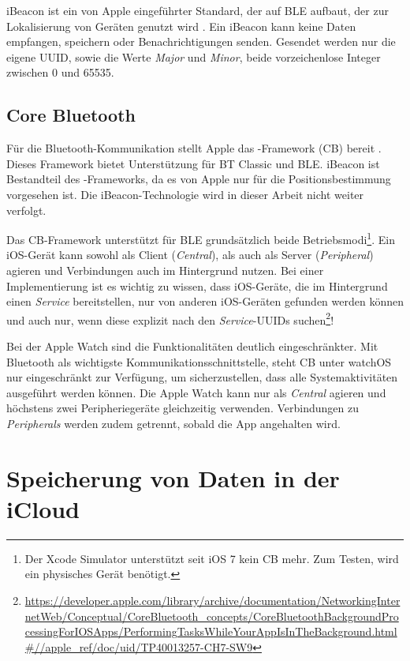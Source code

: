 iBeacon ist ein von Apple eingeführter Standard, der auf \ac{BLE} aufbaut, der zur Lokalisierung von Geräten genutzt wird \cite{Apple-Inc.::iBeacon}\cite{Hiramatsu:2017:Outdoor-Studying-System}. Ein iBeacon kann keine Daten empfangen, speichern oder Benachrichtigungen senden. Gesendet werden nur die eigene \ac{UUID}, sowie die Werte \emph{Major} und \emph{Minor}, beide vorzeichenlose Integer zwischen 0 und 65535.

\subsection{Core Bluetooth}

Für die Bluetooth-Kommunikation stellt Apple das -Framework (\acs{CB}) bereit \cite{Apple-Inc.::Core-Bluetooth}. Dieses Framework bietet Unterstützung für \ac{BT Classic} und \ac{BLE}. iBeacon ist Bestandteil des -Frameworks, da es von Apple nur für die Positionsbestimmung vorgesehen ist. Die iBeacon-Technologie wird in dieser Arbeit nicht weiter verfolgt.

Das \ac{CB}-Framework unterstützt für \ac{BLE} grundsätzlich beide Betriebsmodi\footnote{Der Xcode Simulator unterstützt seit iOS 7 kein \acl{CB} mehr. Zum Testen, wird ein physisches Gerät benötigt.}. Ein iOS-Gerät kann sowohl als Client (\emph{Central}), als auch als Server (\emph{Peripheral}) agieren und Verbindungen auch im Hintergrund nutzen. Bei einer Implementierung ist es wichtig zu wissen, dass iOS-Geräte, die im Hintergrund einen \emph{Service} bereitstellen, nur von anderen iOS-Geräten gefunden werden können und auch nur, wenn diese explizit nach den \emph{Service}-\acp{UUID} suchen\footnote{\url{https://developer.apple.com/library/archive/documentation/NetworkingInternetWeb/Conceptual/CoreBluetooth_concepts/CoreBluetoothBackgroundProcessingForIOSApps/PerformingTasksWhileYourAppIsInTheBackground.html\#//apple_ref/doc/uid/TP40013257-CH7-SW9}}!

Bei der Apple Watch sind die Funktionalitäten deutlich eingeschränkter. Mit Bluetooth als wichtigste Kommunikationsschnittstelle, steht \acl{CB} unter watchOS nur eingeschränkt zur Verfügung, um sicherzustellen, dass alle Systemaktivitäten ausgeführt werden können. Die Apple Watch kann nur als \emph{Central} agieren und höchstens zwei Peripheriegeräte gleichzeitig verwenden. Verbindungen zu \emph{Peripherals} werden zudem getrennt, sobald die App angehalten wird.

\section{Speicherung von Daten in der iCloud}

